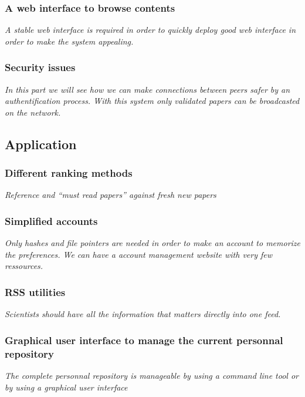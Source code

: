 \subsubsection{A web interface to browse contents}

\textit{A stable web interface is required in order to
quickly deploy good web interface in order to make the system
appealing.}

\subsubsection{Security issues}

\textit{In this part we will see how we can make connections
between peers safer by an authentification process. With this
system only validated papers can be broadcasted on the network.}

\subsection{Application}

\subsubsection{Different ranking methods}

\textit{Reference and ``must read papers'' against fresh new papers}

\subsubsection{Simplified accounts}

\textit{Only hashes and file pointers are needed in order to make an
account to memorize the preferences. We can have a account management
website with very few ressources.}

\subsubsection{RSS utilities}

\textit{Scientists should have all the information that matters directly into
one feed.}

\subsubsection{Graphical user interface to manage the current personnal repository}

\textit{The complete personnal repository is manageable by using a command line
tool or by using a graphical user interface}

